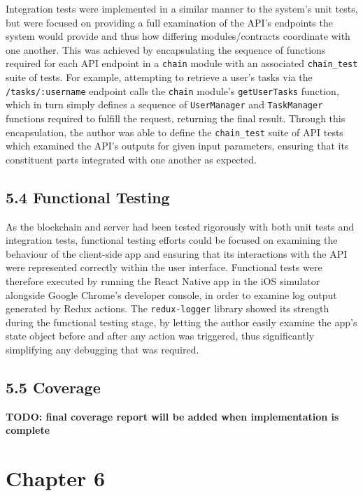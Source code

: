 \documentclass[12pt]{report}
\begin{document}
Integration tests were implemented in a similar manner to the system's
unit tests, but were focused on providing a full examination of the
API's endpoints the system would provide and thus how differing
modules/contracts coordinate with one another. This was achieved by
encapsulating the sequence of functions required for each API endpoint
in a \texttt{chain} module with an associated \texttt{chain\_test} suite
of tests. For example, attempting to retrieve a user's tasks via the
\texttt{/tasks/:username} endpoint calls the \texttt{chain} module's
\texttt{getUserTasks} function, which in turn simply defines a sequence
of \texttt{UserManager} and \texttt{TaskManager} functions required to
fulfill the request, returning the final result. Through this
encapsulation, the author was able to define the \texttt{chain\_test}
suite of API tests which examined the API's outputs for given input
parameters, ensuring that its constituent parts integrated with one
another as expected.

\subsection{5.4 Functional Testing}\label{functional-testing}

As the blockchain and server had been tested rigorously with both unit
tests and integration tests, functional testing efforts could be focused
on examining the behaviour of the client-side app and ensuring that its
interactions with the API were represented correctly within the user
interface. Functional tests were therefore executed by running the React
Native app in the iOS simulator alongside Google Chrome's developer
console, in order to examine log output generated by Redux actions. The
\texttt{redux-logger} library showed its strength during the functional
testing stage, by letting the author easily examine the app's state
object before and after any action was triggered, thus significantly
simplifying any debugging that was required.

\subsection{5.5 Coverage}\label{coverage}

\textbf{TODO: final coverage report will be added when implementation is
complete}

\section{Chapter 6}\label{chapter-6-1}
\end{document}
